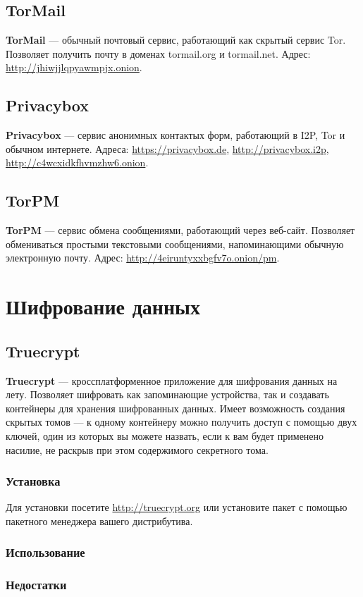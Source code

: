 \subsection{TorMail}
\textbf{TorMail} --- обычный почтовый сервис, работающий как скрытый сервис Tor. Позволяет получить почту в доменах tormail.org и tormail.net. Адрес: \url{http://jhiwjjlqpyawmpjx.onion}.
\subsection{Privacybox}
\textbf{Privacybox} --- сервис анонимных контактых форм, работающий в I2P, Tor и обычном интернете. Адреса: \url{https://privacybox.de}, \url{http://privacybox.i2p},\\ \url{http://c4wcxidkfhvmzhw6.onion}.
\subsection{TorPM}
\textbf{TorPM} --- сервис обмена сообщениями, работающий через веб-сайт. Позволяет обмениваться простыми текстовыми сообщениями, напоминающими обычную электронную почту. Адрес: \url{http://4eiruntyxxbgfv7o.onion/pm}.

\section{Шифрование данных}
\subsection{Truecrypt}
\textbf{Truecrypt} --- кроссплатформенное приложение для шифрования данных на лету. Позволяет шифровать как запоминающие устройства, так и создавать контейнеры для хранения шифрованных данных. Имеет возможность создания скрытых томов --- к одному контейнеру можно получить доступ с помощью двух ключей, один из которых вы можете назвать, если к вам будет применено насилие, не раскрыв при этом содержимого секретного тома.
\subsubsection{Установка}
Для установки посетите \url{http://truecrypt.org} или установите пакет с помощью пакетного менеджера вашего дистрибутива.
\subsubsection{Использование}
\subsubsection{Недостатки}
